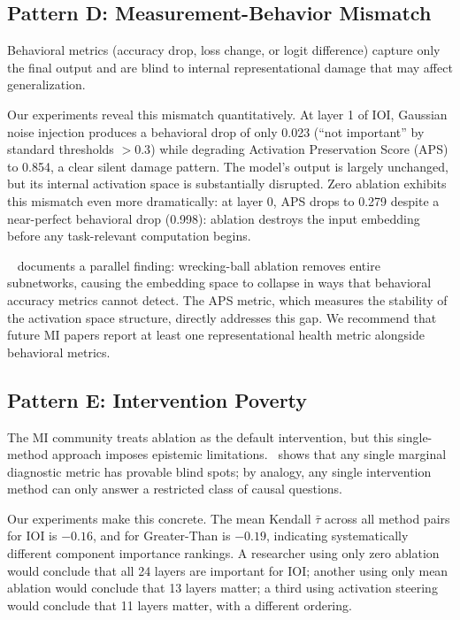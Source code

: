 \documentclass[pdflatex,sn-mathphys-num]{sn-jnl}
\begin{document}
\subsection{Pattern D: Measurement-Behavior Mismatch}
\label{sec:patternD}

Behavioral metrics (accuracy drop, loss change, or logit difference) capture only the final output and are blind to internal representational damage that may affect generalization.

Our experiments reveal this mismatch quantitatively. At layer 1 of IOI, Gaussian noise injection produces a behavioral drop of only 0.023 (``not important'' by standard thresholds $>0.3$) while degrading Activation Preservation Score (APS) to 0.854, a clear silent damage pattern. The model's output is largely unchanged, but its internal activation space is substantially disrupted. Zero ablation exhibits this mismatch even more dramatically: at layer 0, APS drops to 0.279 despite a near-perfect behavioral drop (0.998): ablation destroys the input embedding before any task-relevant computation begins.

~\cite{LehnSchioler2026} documents a parallel finding: wrecking-ball ablation removes entire subnetworks, causing the embedding space to collapse in ways that behavioral accuracy metrics cannot detect. The APS metric, which measures the stability of the activation space structure, directly addresses this gap. We recommend that future MI papers report at least one representational health metric alongside behavioral metrics.

\subsection{Pattern E: Intervention Poverty}
\label{sec:patternE}

The MI community treats ablation as the default intervention, but this single-method approach imposes epistemic limitations.~\cite{Hayashi2026} shows that any single marginal diagnostic metric has provable blind spots; by analogy, any single intervention method can only answer a restricted class of causal questions.

Our experiments make this concrete. The mean Kendall $\bar\tau$ across all method pairs for IOI is $-0.16$, and for Greater-Than is $-0.19$, indicating systematically different component importance rankings. A researcher using only zero ablation would conclude that all 24 layers are important for IOI; another using only mean ablation would conclude that 13 layers matter; a third using activation steering would conclude that 11 layers matter, with a different ordering.
\end{document}

